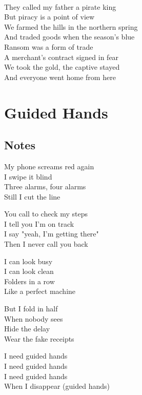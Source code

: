 \begin{lyrics}
\\
They called my father a pirate king\\
But piracy is a point of view\\
We farmed the hills in the northern spring\\
And traded goods when the season's blue \\
Ransom was a form of trade\\
A merchant's contract signed in fear\\
We took the gold, the captive stayed\\
And everyone went home from here
\end{lyrics}

\section{Guided Hands}

\subsection{Notes}
My phone screams red again\\
I swipe it blind\\
Three alarms, four alarms\\
Still I cut the line

You call to check my steps\\
I tell you I'm on track\\
I say "yeah, I'm getting there"\\
Then I never call you back

I can look busy\\
I can look clean\\
Folders in a row\\
Like a perfect machine

But I fold in half\\
When nobody sees\\
Hide the delay\\
Wear the fake receipts

I need guided hands\\
I need guided hands\\
I need guided hands\\
When I disappear (guided hands)

